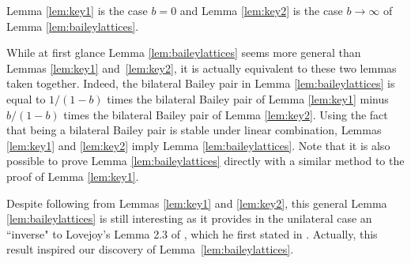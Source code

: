 \begin{Remark}
Lemma \ref{lem:key1} is the case $b=0$ and Lemma \ref{lem:key2} is the case $b \rightarrow \infty$ of Lemma \ref{lem:baileylattices}.
\end{Remark}

\begin{Remark}
While at first glance Lemma \ref{lem:baileylattices} seems more general than Lemmas \ref{lem:key1} and~\ref{lem:key2}, it is actually equivalent to these two lemmas taken together. Indeed, the bilateral Bailey pair in Lemma \ref{lem:baileylattices} is equal to $1/(1-b)$ times the bilateral Bailey pair of Lemma \ref{lem:key1} minus~${b/(1-b)}$ times the bilateral Bailey pair of Lemma \ref{lem:key2}. Using the fact that being a bilateral Bailey pair is stable under linear combination, Lemmas \ref{lem:key1} and \ref{lem:key2} imply Lemma \ref{lem:baileylattices}. Note that it is also possible to prove Lemma \ref{lem:baileylattices} directly with a similar method to the proof of Lemma \ref{lem:key1}.
\end{Remark}

Despite following from Lemmas \ref{lem:key1} and \ref{lem:key2}, this general Lemma \ref{lem:baileylattices} is still interesting as it provides in the unilateral case an ``inverse" to Lovejoy's Lemma 2.3 of \cite{Lo22}, which he first stated in \cite[equations (2.4) and (2.5)]{Lo04}. Actually, this result inspired our discovery of Lemma~\ref{lem:baileylattices}.

